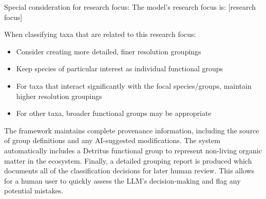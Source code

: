 \begin{prompt}
Special consideration for research focus:
The model's research focus is: [research focus]

When classifying taxa that are related to this research focus:
\begin{itemize}
\item Consider creating more detailed, finer resolution groupings
\item Keep species of particular interest as individual functional groups
\item For taxa that interact significantly with the focal species/groups, maintain higher resolution groupings
\item For other taxa, broader functional groups may be appropriate
\end{itemize}
\end{prompt}

The framework maintains complete provenance information, including the source of group definitions and any AI-suggested modifications. The system automatically includes a Detritus functional group to represent non-living organic matter in the ecosystem. Finally, a detailed grouping report is produced which documents all of the classification decisions for later human review. This allows for a human user to quickly assess the LLM's decision-making and flag any potential mistakes.
